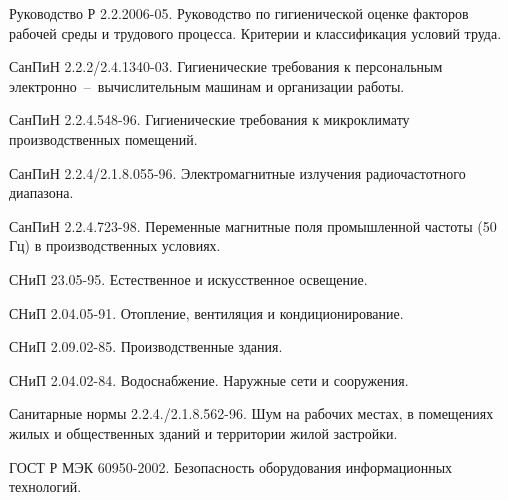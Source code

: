    Руководство Р 2.2.2006-05.
                                    Руководство по гигиенической оценке факторов
                                    рабочей среды и трудового процесса. Критерии
                                    и классификация условий труда.

    СанПиН 2.2.2/2.4.1340-03.
                                    Гигиенические требования к персональным
                                    электронно~--~вычислительным машинам и
                                    организации работы.

     СанПиН 2.2.4.548-96.
                                    Гигиенические требования к микроклимату
                                    производственных помещений.

     СанПиН 2.2.4/2.1.8.055-96.
                                    Электромагнитные излучения радиочастотного
                                    диапазона.

     СанПиН 2.2.4.723-98.
                                    Переменные магнитные поля промышленной
                                    частоты (50 Гц) в производственных условиях.

     СНиП 23.05-95.
                                    Естественное и искусственное освещение.

     СНиП 2.04.05-91.
                                    Отопление, вентиляция и кондиционирование.

    СНиП 2.09.02-85.
                                Производственные здания.

    СНиП 2.04.02-84.
                                Водоснабжение.
                                Наружные сети и сооружения.

  Санитарные нормы 2.2.4./2.1.8.562-96.
                                        Шум на рабочих местах, в помещениях
                                        жилых и общественных зданий и
                                        территории жилой застройки.

   ГОСТ Р МЭК 60950-2002.
                                    Безопасность оборудования информационных
                                    технологий.

